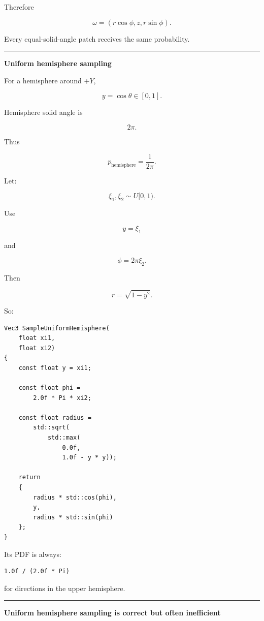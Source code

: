 Therefore

\[
\boxed{
\omega=
\left(
r\cos\phi,
z,
r\sin\phi
\right).
}
\]

Every equal-solid-angle patch receives the same probability.

\begin{center}\rule{0.5\linewidth}{0.5pt}\end{center}

\textbf{Uniform hemisphere sampling}

For a hemisphere around \(+Y\),

\[
y=\cos\theta\in[0,1].
\]

Hemisphere solid angle is

\[
2\pi.
\]

Thus

\[
\boxed{
p_{\text{hemisphere}}
=
\frac{1}{2\pi}.
}
\]

Let:

\[
\xi_1,\xi_2\sim U[0,1).
\]

Use

\[
\boxed{
y=\xi_1
}
\]

and

\[
\phi=2\pi\xi_2.
\]

Then

\[
r=\sqrt{1-y^2}.
\]

So:

\begin{verbatim}
Vec3 SampleUniformHemisphere(
    float xi1,
    float xi2)
{
    const float y = xi1;

    const float phi =
        2.0f * Pi * xi2;

    const float radius =
        std::sqrt(
            std::max(
                0.0f,
                1.0f - y * y));

    return
    {
        radius * std::cos(phi),
        y,
        radius * std::sin(phi)
    };
}
\end{verbatim}

Its PDF is always:

\begin{verbatim}
1.0f / (2.0f * Pi)
\end{verbatim}

for directions in the upper hemisphere.

\begin{center}\rule{0.5\linewidth}{0.5pt}\end{center}

\textbf{Uniform hemisphere sampling is correct but often inefficient}

